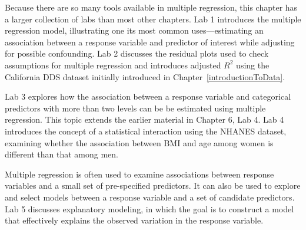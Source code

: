 Because there are so many tools available in multiple regression, this chapter has a larger collection of labs than most other chapters. Lab 1 introduces the multiple regression model, illustrating one its most common uses---estimating an association between a response variable and predictor of interest while adjusting for possible confounding. Lab 2 discusses the residual plots used to check assumptions for multiple regression and introduces adjusted $R^2$ using the California DDS dataset initially introduced in Chapter~\ref{introductionToData}. 

Lab 3 explores how the association between a response variable and categorical predictors with more than two levels can be be estimated using multiple regression. This topic extends the earlier material in Chapter 6, Lab 4. Lab 4 introduces the concept of a statistical interaction using the NHANES dataset, examining whether the association between BMI and age among women is different than that among men. 

Multiple regression is often used to examine associations between response variables and a small set of pre-specified predictors. It can also be used to explore and select models between a response variable and a set of candidate predictors. Lab 5 discusses explanatory modeling, in which the goal is to construct a model that effectively explains the observed variation in the response variable. 
